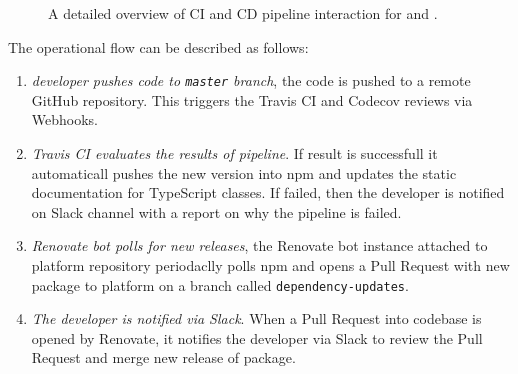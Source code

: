 \begin{figure}[h]
\centering
{}
\caption{A detailed overview of CI and CD pipeline interaction for \lpa{} and \lpas{}.}
\label{fig:lpas_ci_integration}
\end{figure}

The operational flow can be described as follows:
\begin{enumerate}
    \item \textit{\lpas{} developer pushes code to \texttt{master} branch}, the code is pushed to a remote GitHub repository. This triggers the Travis CI and Codecov reviews via Webhooks.
    \item \textit{Travis CI evaluates the results of pipeline}. If result is successfull it automaticall pushes the new version into npm and updates the static documentation for TypeScript classes. If failed, then the \lpas{} developer is notified on Slack channel with a report on why the pipeline is failed.
    \item \textit{Renovate bot polls for new \lpas{} releases}, the Renovate bot instance attached to \lpa{} platform repository periodaclly polls npm and opens a Pull Request with new \lpas{} package to \lpa{} platform on a branch called \texttt{dependency-updates}. 
    \item \textit{The \lpa{} developer is notified via Slack}. When a Pull Request into \lpa{} codebase is opened by Renovate, it notifies the \lpa{} developer via Slack to review the Pull Request and merge new release of \lpas{} package.
\end{enumerate} 
